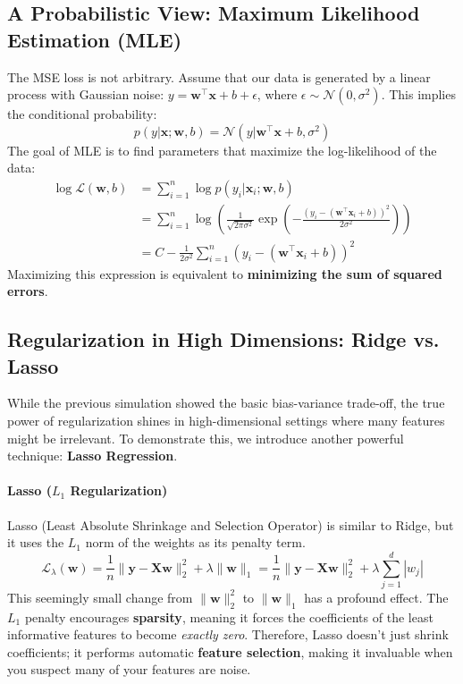 \documentclass{article}
\newcommand{\w}{\mathbf{w}}
\newcommand{\x}{\mathbf{x}}
\newcommand{\y}{\mathbf{y}}
\newcommand{\X}{\mathbf{X}}
\newcommand{\N}{\mathcal{N}}
\newcommand{\loss}{\mathcal{L}}
\newcommand{\T}{^\top}
\begin{document}
\subsection{A Probabilistic View: Maximum Likelihood Estimation (MLE)}
The MSE loss is not arbitrary. Assume that our data is generated by a linear process with Gaussian noise: $y = \w\T\x + b + \epsilon$, where $\epsilon \sim \N(0, \sigma^2)$. This implies the conditional probability:
\begin{equation}
    p(y | \x; \w, b) = \N(y | \w\T\x + b, \sigma^2)
\end{equation}
The goal of MLE is to find parameters that maximize the log-likelihood of the data:
\begin{align*}
    \log \mathcal{L}(\w, b) &= \sum_{i=1}^n \log p(y_i | \x_i; \w, b) \\
    &= \sum_{i=1}^n \log \left( \frac{1}{\sqrt{2\pi\sigma^2}} \exp\left(-\frac{(y_i - (\w\T\x_i+b))^2}{2\sigma^2}\right) \right) \\
    &= C - \frac{1}{2\sigma^2} \sum_{i=1}^n (y_i - (\w\T\x_i+b))^2
\end{align*}
Maximizing this expression is equivalent to \textbf{minimizing the sum of squared errors}.




\subsection{Regularization in High Dimensions: Ridge vs. Lasso}

While the previous simulation showed the basic bias-variance trade-off, the true power of regularization shines in high-dimensional settings where many features might be irrelevant. To demonstrate this, we introduce another powerful technique: \textbf{Lasso Regression}.

\paragraph{Lasso ($L_1$ Regularization)}
Lasso (Least Absolute Shrinkage and Selection Operator) is similar to Ridge, but it uses the $L_1$ norm of the weights as its penalty term.
\begin{equation}
    \loss_\lambda(\w) = \frac{1}{n}\|\y - \X\w\|_2^2 + \lambda\|\w\|_1 = \frac{1}{n}\|\y - \X\w\|_2^2 + \lambda \sum_{j=1}^d |w_j|
\end{equation}
This seemingly small change from $\|\w\|_2^2$ to $\|\w\|_1$ has a profound effect. The $L_1$ penalty encourages \textbf{sparsity}, meaning it forces the coefficients of the least informative features to become \textit{exactly zero}. Therefore, Lasso doesn't just shrink coefficients; it performs automatic \textbf{feature selection}, making it invaluable when you suspect many of your features are noise.
\end{document}
